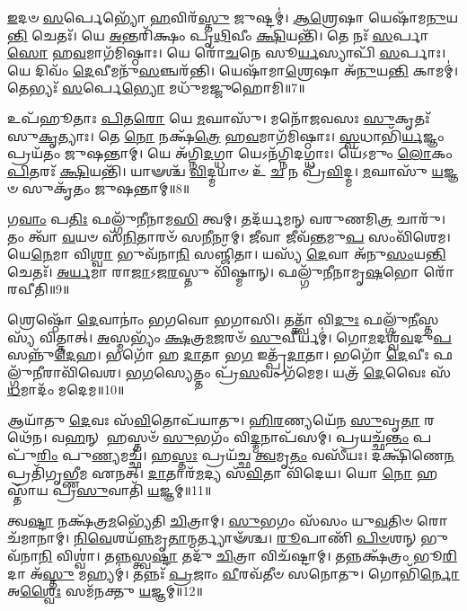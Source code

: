 \-\ul{𑌇}\-𑌦𑍞 \ul{𑌸}\-𑌰𑍍𑌪𑍇𑌭𑍍𑌯𑍋᳴ \ul{𑌹}\-𑌵𑌿𑌰᳴\-\ul{𑌸𑍍𑌤𑍁} 𑌜𑍁𑌷𑍍𑌟𑌮𑍍॑। 
\-\ul{𑌆}\-\-\ul{𑌶𑍍𑌰𑍇}\-𑌷𑌾 𑌯𑍇𑌷𑌾᳴𑌮\-\ul{𑌨𑍁}\-𑌯\-\ul{𑌨𑍍𑌤𑌿} 𑌚𑍇𑌤𑌃᳴। 
𑌯𑍇 \ul{𑌅}\-𑌨𑍍𑌤𑌰𑌿᳴𑌕𑍍𑌷𑌂 𑌪𑍃\-\ul{𑌥𑌿}\-𑌵𑍀𑌂 \ul{𑌕𑍍𑌷𑌿}\-𑌯𑌨𑍍𑌤𑌿᳴। 
𑌤𑍇 𑌨𑌃᳴ \ul{𑌸}\-𑌰𑍍𑌪𑌾\-\ul{𑌸𑍋} 𑌹\-\ul{𑌵}\-𑌮𑌾𑌗᳴𑌮𑌿𑌷𑍍𑌠𑌾𑌃। 
𑌯𑍇 𑌰𑍋᳴\-\ul{𑌚}\-𑌨𑍇 𑌸𑍂\-\ul{𑌰𑍍𑌯}\-𑌸𑍍𑌯𑌾𑌪𑌿᳴ \ul{𑌸}\-𑌰𑍍𑌪𑌾𑌃। 
𑌯𑍇 𑌦𑌿𑌵𑌂᳴ \ul{𑌦𑍇}\-𑌵𑍀𑌮𑌨𑍁᳴\-\ul{𑌸}\-𑌞𑍍𑌚𑌰᳴𑌨𑍍𑌤𑌿। 
𑌯𑍇𑌷𑌾᳴𑌮𑌾\-\ul{𑌶𑍍𑌰𑍇}\-𑌷𑌾 𑌅᳴\-\ul{𑌨𑍁}\-𑌯\-\ul{𑌨𑍍𑌤𑌿} 𑌕𑌾𑌮𑌮𑍍॑। 
𑌤𑍇𑌭𑍍𑌯𑌃᳴ \ul{𑌸}\-𑌰𑍍𑌪𑍇\-\ul{𑌭𑍍𑌯𑍋} 𑌮𑌧𑍁᳴𑌮𑌜𑍍𑌜𑍁𑌹𑍋𑌮𑌿॥7॥ 

𑌉𑌪᳴𑌹𑍂𑌤𑌾𑌃 \ul{𑌪𑌿}\-𑌤\-\ul{𑌰𑍋} 𑌯𑍇 \ul{𑌮}\-𑌘𑌾𑌸𑍁᳴। 
𑌮𑌨𑍋᳴𑌜𑌵𑌸𑌃 \ul{𑌸𑍁}\-𑌕𑍃𑌤𑌃᳴ 𑌸𑍁\-\ul{𑌕𑍃}\-𑌤𑍍𑌯𑌾𑌃। 
𑌤𑍇 \ul{𑌨𑍋} 𑌨𑌕𑍍𑌷᳴\-\ul{𑌤𑍍𑌰𑍇} 𑌹\-\ul{𑌵}\-𑌮𑌾𑌗᳴𑌮𑌿𑌷𑍍𑌠𑌾𑌃। 
\-\ul{𑌸𑍍𑌵}\-𑌧𑌾𑌭𑌿᳴\-\ul{𑌰𑍍𑌯}\-𑌜𑍍𑌞𑌂 𑌪𑍍𑌰𑌯᳴𑌤𑌂 𑌜𑍁𑌷𑌨𑍍𑌤𑌾𑌮𑍍। 
𑌯𑍇 𑌅᳴𑌗𑍍𑌨𑌿\-\ul{𑌦}\-𑌗𑍍𑌧𑌾 𑌯𑍇𑌽𑌨᳴𑌗𑍍𑌨𑌿𑌦𑌗𑍍𑌧𑌾𑌃। 
𑌯𑍇᳴𑌽𑌮𑍁𑌂 \ul{𑌲𑍋}\-𑌕𑌂 \ul{𑌪𑌿}\-𑌤𑌰𑌃᳴ \ul{𑌕𑍍𑌷𑌿}\-𑌯𑌨𑍍𑌤𑌿᳴। 
𑌯𑌾𑍟𑌶𑍍𑌚᳴ \ul{𑌵𑌿}\-𑌦𑍍𑌮𑌯𑌾𑍞 𑌉᳴ \ul{𑌚} 𑌨 𑌪𑍍𑌰᳴\-\ul{𑌵𑌿}\-𑌦𑍍𑌮। 
\-\ul{𑌮}\-𑌘𑌾𑌸𑍁᳴ \ul{𑌯}\-𑌜𑍍𑌞𑍞 𑌸𑍁𑌕𑍃᳴𑌤𑌂 𑌜𑍁𑌷𑌨𑍍𑌤𑌾𑌮𑍍॥8॥ 

𑌗\-\ul{𑌵𑌾𑌂} 𑌪\-\ul{𑌤𑌿𑌃} 𑌫𑌲𑍍𑌗𑍁᳴𑌨𑍀𑌨𑌾𑌮\-\ul{𑌸𑌿} 𑌤𑍍𑌵𑌮𑍍। 
𑌤𑌦᳴𑌰𑍍𑌯𑌮𑌨𑍍 𑌵𑌰𑍁𑌣𑌮𑌿\-\ul{𑌤𑍍𑌰} 𑌚𑌾𑌰𑍁᳴। 
𑌤𑌂 𑌤𑍍𑌵𑌾᳴ \ul{𑌵}\-𑌯𑍞 𑌸᳴\-\ul{𑌨𑌿}\-𑌤𑌾𑌰𑍞᳴ 𑌸\-\ul{𑌨𑍀}\-𑌨𑌾𑌮𑍍। 
\-\ul{𑌜𑍀}\-𑌵𑌾 𑌜𑍀𑌵᳴\-\ul{𑌨𑍍𑌤}\-𑌮𑍁\-\ul{𑌪} 𑌸𑌂𑌵𑌿᳴𑌶𑍇𑌮। 
𑌯𑍇\-\ul{𑌨𑍇}\-𑌮𑌾 𑌵𑌿\-\ul{𑌶𑍍𑌵𑌾} 𑌭𑍁𑌵᳴𑌨𑌾\-\ul{𑌨𑌿} 𑌸𑌞𑍍𑌜𑌿᳴𑌤𑌾। 
𑌯𑌸𑍍𑌯᳴ \ul{𑌦𑍇}\-𑌵𑌾 𑌅᳴𑌨𑍁\-\ul{𑌸𑌂}\-𑌯\-\ul{𑌨𑍍𑌤𑌿} 𑌚𑍇𑌤𑌃᳴। 
\-\ul{𑌅}\-\-\ul{𑌰𑍍𑌯}\-𑌮𑌾 𑌰𑌾\-\ul{𑌜𑌾}\-𑌽𑌜\-\ul{𑌰}\-𑌸𑍍𑌤𑍁 𑌵𑌿᳴𑌷𑍍𑌮𑌾𑌨𑍍। 
𑌫𑌲𑍍𑌗𑍁᳴𑌨𑍀𑌨𑌾𑌮𑍃\-\ul{𑌷}\-𑌭𑍋 𑌰𑍋᳴𑌰𑌵𑍀𑌤𑌿॥9॥ 

𑌶𑍍𑌰𑍇𑌷𑍍𑌠𑍋᳴ \ul{𑌦𑍇}\-𑌵𑌾𑌨𑌾𑌂॑ 𑌭𑌗𑌵𑍋 𑌭𑌗𑌾𑌸𑌿। 
𑌤𑌤𑍍𑌤𑍍𑌵𑌾᳴ 𑌵𑌿\-\ul{𑌦𑍁𑌃} 𑌫𑌲𑍍𑌗𑍁᳴\-\ul{𑌨𑍀}\-𑌸𑍍𑌤𑌸𑍍𑌯᳴ 𑌵𑌿𑌤𑍍𑌤𑌾𑌤𑍍। 
\-\ul{𑌅}\-𑌸𑍍𑌮𑌭𑍍𑌯𑌂᳴ \ul{𑌕𑍍𑌷}\-𑌤𑍍𑌰\-\ul{𑌮}\-𑌜𑌰𑍞᳴ \ul{𑌸𑍁}\-𑌵𑍀𑌰𑍍𑌯𑌮𑍍॑। 
𑌗𑍋\-\ul{𑌮}\-𑌦𑌶𑍍𑌵᳴\-\ul{𑌵}\-𑌦𑍁\-\ul{𑌪}\-𑌸𑌨𑍍𑌨𑍁᳴\-\-\ul{𑌦𑍇}\-𑌹। 
𑌭𑌗𑍋᳴ 𑌹 \ul{𑌦𑌾}\-𑌤𑌾 𑌭\-\ul{𑌗} 𑌇𑌤𑍍𑌪𑍍𑌰᳴\-\ul{𑌦𑌾}\-𑌤𑌾। 
𑌭𑌗𑍋᳴ \ul{𑌦𑍇}\-𑌵𑍀𑌃 𑌫𑌲𑍍𑌗𑍁᳴\-\ul{𑌨𑍀}\-𑌰𑌾𑌵𑌿᳴𑌵𑍇𑌶। 
𑌭\-\ul{𑌗}\-𑌸𑍍𑌯𑍇𑌤𑍍𑌤𑌂 𑌪𑍍𑌰᳴\-\ul{𑌸}\-𑌵𑌂 𑌗᳴𑌮𑍇𑌮। 
𑌯𑌤𑍍𑌰᳴ \ul{𑌦𑍇}\-𑌵𑍈𑌃 𑌸᳴\-\ul{𑌧}\-𑌮𑌾𑌦𑌂᳴ 𑌮𑌦𑍇𑌮॥10॥ 

𑌆𑌯𑌾᳴𑌤𑍁 \ul{𑌦𑍇}\-𑌵𑌃 𑌸᳴\-\ul{𑌵𑌿}\-𑌤𑍋𑌪᳴𑌯𑌾𑌤𑍁। 
\-\ul{𑌹𑌿}\-\-\ul{𑌰}\-𑌣𑍍𑌯𑌯𑍇᳴𑌨 \ul{𑌸𑍁}\-𑌵𑍃\-\ul{𑌤𑌾} 𑌰𑌥𑍇᳴𑌨। 
𑌵\-\ul{𑌹}\-𑌨𑍍 𑌹𑌸𑍍𑌤𑍞᳴ \ul{𑌸𑍁}\-𑌭𑌗𑌂᳴ 𑌵𑌿\-\ul{𑌦𑍍𑌮}\-𑌨𑌾𑌪᳴𑌸𑌮𑍍। 
𑌪𑍍𑌰𑌯𑌚𑍍𑌛᳴\-\ul{𑌨𑍍𑌤𑌂} 𑌪𑌪𑍁᳴\-\ul{𑌰𑌿𑌂} 𑌪𑍁\-\ul{𑌣𑍍𑌯}\-𑌮𑌚𑍍𑌛᳴। 
𑌹\-\ul{𑌸𑍍𑌤𑌃} 𑌪𑍍𑌰𑌯᳴𑌚𑍍𑌛 \ul{𑌤𑍍𑌵}\-𑌮𑍃\-\ul{𑌤𑌂} 𑌵𑌸𑍀᳴𑌯𑌃। 
𑌦𑌕𑍍𑌷𑌿᳴𑌣𑍇\-\ul{𑌨} 𑌪𑍍𑌰𑌤𑌿᳴𑌗𑍃𑌭𑍍𑌣𑍀𑌮 𑌏𑌨𑌤𑍍। 
\-\ul{𑌦𑌾}\-𑌤𑌾𑌰᳴\-\ul{𑌮}\-𑌦𑍍𑌯 𑌸᳴\-\ul{𑌵𑌿}\-𑌤𑌾 𑌵𑌿᳴𑌦𑍇𑌯। 
𑌯𑍋 \ul{𑌨𑍋} 𑌹𑌸𑍍𑌤𑌾᳴𑌯 𑌪𑍍𑌰\-\ul{𑌸𑍁}\-𑌵𑌾𑌤𑌿᳴ \ul{𑌯}\-𑌜𑍍𑌞𑌮𑍍॥11॥ 

𑌤𑍍𑌵\-\ul{𑌷𑍍𑌟𑌾} 𑌨𑌕𑍍𑌷᳴𑌤𑍍𑌰\-\ul{𑌮}\-𑌭𑍍𑌯𑍇᳴𑌤𑌿 \ul{𑌚𑌿}\-𑌤𑍍𑌰𑌾𑌮𑍍। 
\-\ul{𑌸𑍁}\-𑌭𑌗𑌂 𑌸᳴𑌸𑌂 𑌯𑍁\-\ul{𑌵}\-𑌤𑌿𑍞 𑌰𑍋𑌚᳴𑌮𑌾𑌨𑌾𑌮𑍍। 
\-\ul{𑌨𑌿}\-\-\ul{𑌵𑍇}\-𑌶𑌯᳴\-\ul{𑌨𑍍𑌨}\-\-𑌮𑍃\-\ul{𑌤𑌾}\-𑌨𑍍𑌮𑌰𑍍𑌤𑍍𑌯𑌾𑍟᳴𑌶𑍍𑌚। 
\-\ul{𑌰𑍂}\-𑌪𑌾𑌣𑌿᳴ \ul{𑌪𑌿}\-\-\ul{𑍞}\-𑌶𑌨𑍍 𑌭𑍁𑌵᳴𑌨𑌾\-\ul{𑌨𑌿} 𑌵𑌿𑌶𑍍𑌵𑌾॑। 
𑌤\-\ul{𑌨𑍍𑌨}\-𑌸𑍍𑌤𑍍𑌵\-\ul{𑌷𑍍𑌟𑌾} 𑌤𑌦𑍁᳴ \ul{𑌚𑌿}\-𑌤𑍍𑌰𑌾 𑌵𑌿𑌚᳴𑌷𑍍𑌟𑌾𑌮𑍍। 
𑌤𑌨𑍍𑌨𑌕𑍍𑌷᳴𑌤𑍍𑌰𑌂 𑌭𑍂\-\ul{𑌰𑌿}\-𑌦𑌾 𑌅᳴\-\ul{𑌸𑍍𑌤𑍁} 𑌮𑌹𑍍𑌯𑌮𑍍॑। 
𑌤𑌨𑍍𑌨𑌃᳴ \ul{𑌪𑍍𑌰}\-𑌜𑌾𑌂 \ul{𑌵𑍀}\-𑌰𑌵᳴𑌤𑍀𑍞 𑌸𑌨𑍋𑌤𑍁। 
𑌗𑍋𑌭𑌿᳴\-\ul{𑌰𑍍𑌨𑍋} 𑌅\-\ul{𑌶𑍍𑌵𑍈𑌃} 𑌸𑌮᳴𑌨𑌕𑍍𑌤𑍁 \ul{𑌯}\-𑌜𑍍𑌞𑌮𑍍॥12॥ 

